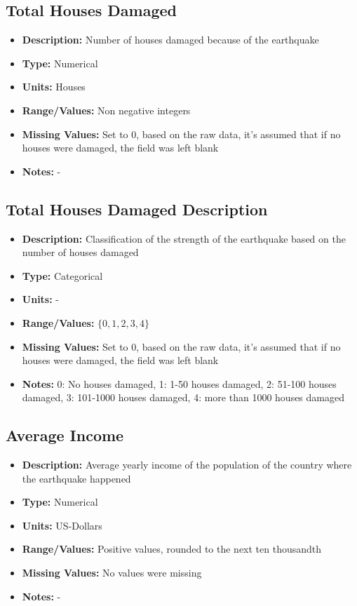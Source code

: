 \documentclass{article}
\begin{document}
\subsection{Total Houses Damaged}
\begin{itemize}
    \item \textbf{Description:} Number of houses damaged because of the earthquake
    \item \textbf{Type:} Numerical
    \item \textbf{Units:} Houses
    \item \textbf{Range/Values:} Non negative integers
    \item \textbf{Missing Values:} Set to 0, based on the raw data, it's assumed that if no houses were damaged, the field was left blank
    \item \textbf{Notes:} -
\end{itemize}

\subsection{Total Houses Damaged Description}
\begin{itemize}
    \item \textbf{Description:} Classification of the strength of the earthquake based on the number of houses damaged
    \item \textbf{Type:} Categorical
    \item \textbf{Units:} -
    \item \textbf{Range/Values:} $\{0,1,2,3,4 \}$
    \item \textbf{Missing Values:} Set to 0, based on the raw data, it's assumed that if no houses were damaged, the field was left blank
    \item \textbf{Notes:} 0: No houses damaged, 1: 1-50 houses damaged, 2: 51-100 houses damaged, 3: 101-1000 houses damaged, 4: more than 1000 houses damaged
\end{itemize}

\subsection{Average Income}
\begin{itemize}
    \item \textbf{Description:} Average yearly income of the population of the country where the earthquake happened
    \item \textbf{Type:} Numerical
    \item \textbf{Units:} US-Dollars
    \item \textbf{Range/Values:} Positive values, rounded to the next ten thousandth
    \item \textbf{Missing Values:} No values were missing
    \item \textbf{Notes:} -
\end{itemize}
\end{document}
